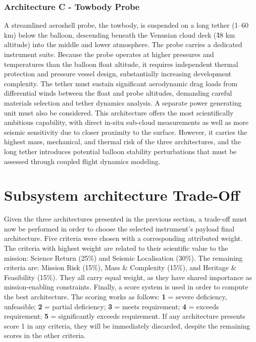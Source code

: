\subsubsection*{Architecture C - Towbody Probe}
A streamlined aeroshell probe, the towbody, is suspended on a long tether (1–60 km) below the balloon, descending beneath the Venusian cloud deck (\~48 km altitude) into the middle and lower atmosphere. The probe carries a dedicated instrument suite. Because the probe operates at higher pressures and temperatures than the balloon float altitude, it requires independent thermal protection and pressure vessel design, substantially increasing development complexity. The tether must sustain significant aerodynamic drag loads from differential winds between the float and probe altitudes, demanding careful materials selection and tether dynamics analysis. A separate power generating unit must also be considered. This architecture offers the most scientifically ambitious capability, with direct in-situ sub-cloud measurements as well as more seismic sensitivity due to closer proximity to the surface. However, it carries the highest mass, mechanical, and thermal risk of the three architectures, and the long tether introduces potential balloon stability perturbations that must be assessed through coupled flight dynamics modeling. 

\section{Subsystem architecture Trade-Off}
\label{sec:payload_tradeoff}
Given the three architectures presented in the previous section, a trade-off must now be performed in order to choose the selected instrument's payload final architecture. Five criteria were chosen with a corresponding attributed weight. The criteria with highest weight are related to their scientific value to the mission: Science Return (25\%) and Seismic Localisation (30\%). The remaining criteria are: Mission Risk (15\%), Mass \& Complexity (15\%), and Heritage \& Feasibility (15\%). They all carry equal weight, as they have shared importance as mission-enabling constraints. Finally, a score system is used in order to compute the best architecture. The scoring works as follows: \textbf{1} = severe deficiency, unfeasible; \textbf{2} = partial deficiency; \textbf{3} = meets requirement; \textbf{4} = exceeds requirement; \textbf{5} = significantly exceeds requirement. If any architecture presents score 1 in any criteria, they will be immediately discarded, despite the remaining scores in the other criteria. 



